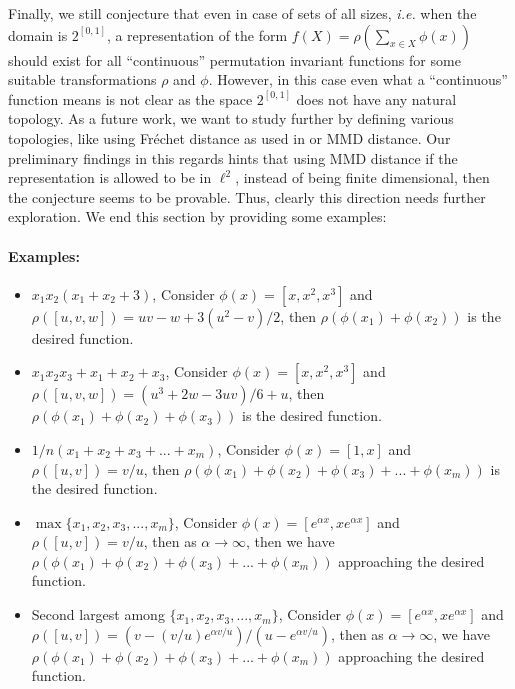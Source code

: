 \documentclass{article}
\newcommand{\latinphrase}[1]{\emph{#1}}    %
\newcommand{\ie}{\latinphrase{i.e.}\xspace}
\begin{document}
Finally, we still conjecture that even in case of sets of all sizes, \ie when the domain is $2^{[0,1]}$, a representation of the form $f(X) = \rho \left( \sum_{x\in X} \phi(x) \right)$ should exist for all ``continuous'' permutation invariant functions for some suitable transformations $\rho$ and $\phi$. However, in this case even what a ``continuous'' function means is not clear as the space $2^{[0,1]}$ does not have any natural topology. As a future work, we want to study further by defining various topologies, like using Fr\'echet distance as used in \cite{curgus2006roots} or MMD distance. Our preliminary findings in this regards hints that using MMD distance if the representation is allowed to be in $\ell^2$, instead of being finite dimensional, then the conjecture seems to be provable. Thus, clearly this direction needs further exploration. We end this section by providing some examples:

\paragraph{Examples:}
\begin{itemize}
\item $x_1x_2(x_1+x_2+3)$, Consider $\phi(x) = [x, x^2, x^3]$ and $\rho([u,v, w])=uv-w+3(u^2-v)/2$, then $\rho(\phi(x_1)+\phi(x_2))$ is the desired function.

\item $x_1x_2x_3+x_1+x_2+x_3$, Consider $\phi(x) = [x, x^2, x^3]$ and $\rho([u,v,w])=(u^3+2w-3uv)/6 + u$, then $\rho(\phi(x_1)+\phi(x_2)+\phi(x_3))$ is the desired function.

\item $1/n(x_1+x_2+x_3+...+x_m)$, Consider $\phi(x) = [1,x]$ and $\rho([u,v])=v/u$, then $\rho(\phi(x_1)+\phi(x_2)+\phi(x_3)+...+\phi(x_m))$ is the desired function.

\item $\max\{x_1,x_2,x_3,...,x_m\}$, Consider $\phi(x) = [e^{\alpha x}, x e^{\alpha x}]$ and $\rho([u,v]) = v/u$, then as $\alpha\to\infty$, then we have $\rho(\phi(x_1)+\phi(x_2)+\phi(x_3)+...+\phi(x_m))$ approaching the desired function.

\item Second largest among $\{x_1,x_2,x_3,...,x_m\}$, Consider $\phi(x) = [e^{\alpha x}, x e^{\alpha x}]$ and $\rho([u,v]) = (v-(v/u)e^{\alpha v/u})/(u-e^{\alpha v/u})$, then as $\alpha\to\infty$, we have $\rho(\phi(x_1)+\phi(x_2)+\phi(x_3)+...+\phi(x_m))$ approaching the desired function.

\end{itemize}
\end{document}
